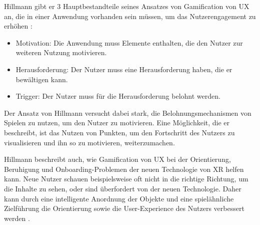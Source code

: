 Hillmann gibt er 3 Hauptbestandteile seines Ansatzes von Gamification von UX an, die in einer Anwendung vorhanden sein müssen, um das Nutzerengagement zu erhöhen \autocite[S.66]{hillmann2021ux}:
\begin{itemize}
  \item Motivation: Die Anwendung muss Elemente enthalten, die den Nutzer zur weiteren Nutzung motivieren.
  \item Herausforderung: Der Nutzer muss eine Herausforderung haben, die er bewältigen kann.
  \item Trigger: Der Nutzer muss für die Herausforderung belohnt werden.
\end{itemize}

Der Ansatz von Hillmann versucht dabei stark, die Belohnungsmechanismen von Spielen zu nutzen, um den Nutzer zu motivieren.
Eine Möglichkeit, die er beschreibt, ist das Nutzen von Punkten, um den Fortschritt des Nutzers zu visualisieren und ihn so zu motivieren, weiterzumachen.

Hillmann beschreibt auch, wie Gamification von UX bei der Orientierung, Beruhigung und Onboarding-Problemen der neuen Technologie von XR helfen kann.
Neue Nutzer schauen beispielsweise oft nicht in die richtige Richtung, um die Inhalte zu sehen, oder sind überfordert von der neuen Technologie.
Daher kann durch eine intelligente Anordnung der Objekte und eine spielähnliche Zielführung die Orientierung sowie die User-Experience des Nutzers verbessert werden \autocite[S.67]{hillmann2021ux}.

